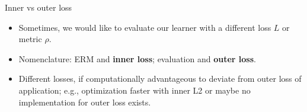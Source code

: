 \documentclass[11pt,compress,t,notes=noshow, xcolor=table]{beamer}
\begin{document}
\begin{vbframe}{Inner vs outer loss}

\begin{itemize}
  \item Sometimes, we would like to evaluate our learner with a different 
      loss $L$ or metric $\rho$.
  \item Nomenclature: ERM and \textbf{inner loss}; evaluation and \textbf{outer loss}. 
  \item Different losses, if computationally advantageous to deviate from outer loss of application; 
      e.g., optimization faster with inner L2 or maybe no implementation for outer loss exists.
\end{itemize}

\vfill


\end{vbframe}
\end{document}
